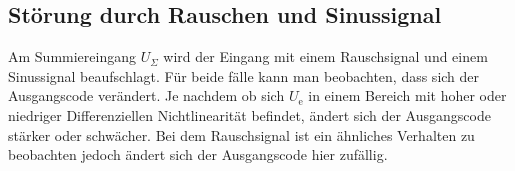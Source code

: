 


\subsection{Störung durch Rauschen und Sinussignal}

Am Summiereingang $U_\Sigma$ wird der Eingang mit einem Rauschsignal und einem Sinussignal beaufschlagt. Für beide fälle kann man beobachten, dass sich der Ausgangscode verändert. Je nachdem ob sich $U_\mathrm{e}$ in einem Bereich mit hoher oder niedriger Differenziellen Nichtlinearität befindet, ändert sich der Ausgangscode stärker oder schwächer. Bei dem Rauschsignal ist ein ähnliches Verhalten zu beobachten jedoch ändert sich der Ausgangscode hier zufällig.
